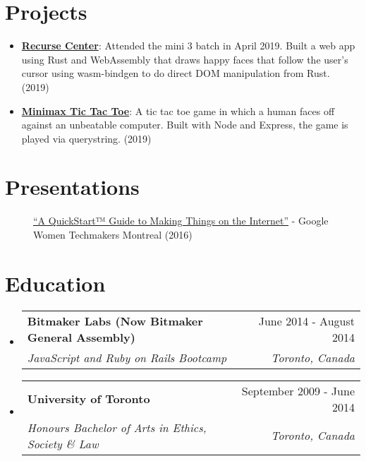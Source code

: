 \documentclass[letterpaper,10.8pt]{article}
\makeatletter
\newcommand{\resumeItem}[2]{
  \item\small{
    \textbf{#1}{: #2 \vspace{-2pt}}
  }
}
\newcommand{\education}[4]{
  \vspace{0pt}\item[]
    \begin{tabular*}{1\textwidth}{l@{\extracolsep{\fill}}r}
      \textbf{#1} & #2 \\
      \textit{\small#3} & \textit{\small #4} \\
    \end{tabular*}\vspace{-4pt}
}
\newcommand{\jobLineItem}[2]{
  \vspace{0pt}\item[]
    \begin{tabular*}{0.98\textwidth}{l@{\extracolsep{\fill}}r}
      \textit{#1} & \textit{\small #2} \\
    \end{tabular*}\vspace{-4pt}
}
\newcommand{\employerTitle}[3]{
  \begin{tabular*}{1\textwidth}{l@{\extracolsep{\fill}}r}
    \href{#1}{\textbf{#2}} & \textbf{#3} \\
  \end{tabular*}\vspace{-4pt}
}
\newcommand{\resumeSubItem}[2]{\resumeItem{#1}{#2}\vspace{-5pt}}
\newcommand{\resumeSubHeadingListStart}{\begin{itemize}[leftmargin=*]}
\newcommand{\educationStart}{\begin{itemize}[leftmargin=0pt]}
\newcommand{\resumeSubHeadingListEnd}{\end{itemize}}
\newcommand{\resumeItemListStart}{\begin{itemize}}
\newcommand{\resumeItemListEnd}{\end{itemize}\vspace{-5pt}}
\makeatother
\begin{document}

\section{Projects}
\resumeSubHeadingListStart
\resumeSubItem{\href{https://github.com/alessbell/lines}{Recurse Center}}{Attended the mini 3 batch in April 2019. Built a web app using Rust and WebAssembly that draws happy faces that follow the user's cursor using wasm-bindgen to do direct DOM manipulation from Rust. (2019)}
\resumeSubItem{\href{https://github.com/alessbell/wave-tic-tac-toe}{Minimax Tic Tac Toe}}{A tic tac toe game in which a human faces off against an unbeatable computer. Built with Node and Express, the game is played via querystring. (2019)}
\vspace{5px}
\resumeSubHeadingListEnd


\section{Presentations}
\begin{description}
\item[] {\href{https://www.youtube.com/watch?v=6EHbfAmA_0c}{“A QuickStart™ Guide to Making Things on the Internet”} - Google Women Techmakers Montreal (2016)}
\end{description}

\section{Education}
  \educationStart
    \education
      {Bitmaker Labs (Now Bitmaker General Assembly)}{June 2014 - August 2014}
      {JavaScript and Ruby on Rails Bootcamp}{Toronto, Canada}
    \education
      {University of Toronto}{September 2009 - June 2014}
      {Honours Bachelor of Arts in Ethics, Society \& Law}{Toronto, Canada}
    \vspace{-4px}
  \resumeSubHeadingListEnd



\end{document}
